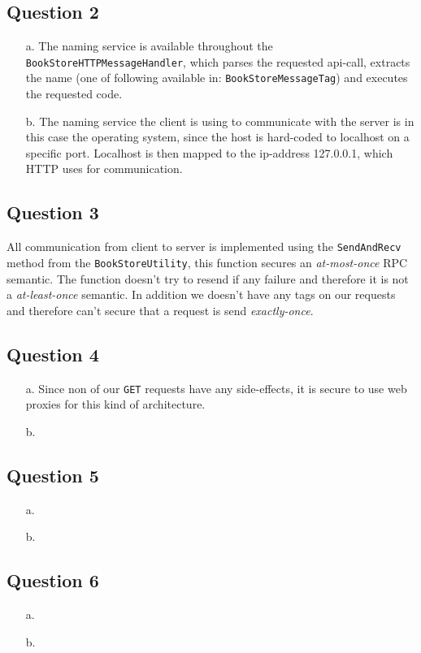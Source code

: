 \documentclass[10pt,a4paper]{article}
\begin{document}
\subsection*{Question 2}
\begin{itemize}
	\item[a.] The naming service is available throughout the \texttt{BookStoreHTTPMessageHandler}, which parses the requested api-call, extracts the name (one of following available in: \texttt{BookStoreMessageTag}) and executes the requested code.
	\item[b.] The naming service the client is using to communicate with the server is in this case the operating system, since the host is hard-coded to localhost on a specific port. Localhost is then mapped to the ip-address 127.0.0.1, which HTTP uses for communication.
\end{itemize}

\subsection*{Question 3}
All communication from client to server is implemented using the \texttt{SendAndRecv} method from the \texttt{BookStoreUtility}, this function secures an \textit{at-most-once} RPC semantic. The function doesn't try to resend if any failure and therefore it is not a \textit{at-least-once} semantic. In addition we doesn't have any tags on our requests and therefore can't secure that a request is send \textit{exactly-once}.

\subsection*{Question 4}
\begin{itemize}
	\item[a.]  Since non of our \texttt{GET} requests have any side-effects, it is secure to use web proxies for this kind of architecture.
	\item[b.] 
\end{itemize}

\subsection*{Question 5}
\begin{itemize}
	\item[a.] 
	\item[b.]
\end{itemize}

\subsection*{Question 6}
\begin{itemize}
	\item[a.] 
	\item[b.]
\end{itemize}
\end{document}
